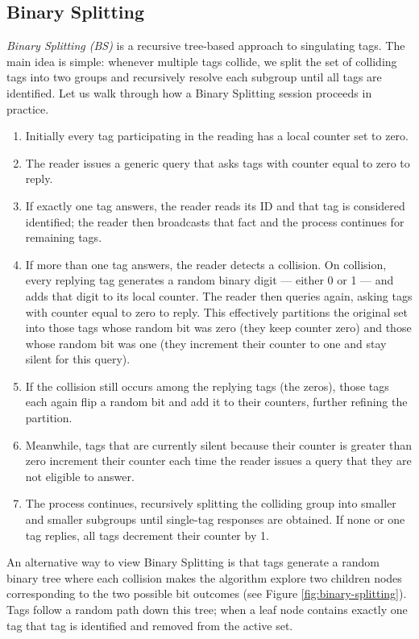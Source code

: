 \subsection{Binary Splitting}
\textit{Binary Splitting (BS)} is a recursive tree-based approach to singulating tags. The main idea is simple: whenever multiple tags collide, we split the set of colliding tags into two groups and recursively resolve each subgroup until all tags are identified.
Let us walk through how a Binary Splitting session proceeds in practice. 
\begin{enumerate}
    \item Initially every tag participating in the reading has a local counter set to zero. 
    \item The reader issues a generic query that asks tags with counter equal to zero to reply. 
    \item If exactly one tag answers, the reader reads its ID and that tag is considered identified; the reader then broadcasts that fact and the process continues for remaining tags.
    \item If more than one tag answers, the reader detects a collision. On collision, every replying tag generates a random binary digit — either 0 or 1 — and adds that digit to its local counter. The reader then queries again, asking tags with counter equal to zero to reply. This effectively partitions the original set into those tags whose random bit was zero (they keep counter zero) and those whose random bit was one (they increment their counter to one and stay silent for this query). 
    \item If the collision still occurs among the replying tags (the zeros), those tags each again flip a random bit and add it to their counters, further refining the partition.
    \item Meanwhile, tags that are currently silent because their counter is greater than zero increment their counter each time the reader issues a query that they are not eligible to answer. 
    \item The process continues, recursively splitting the colliding group into smaller and smaller subgroups until single-tag responses are obtained. If none or one tag replies, all tags decrement their counter by 1.
\end{enumerate}
An alternative way to view Binary Splitting is that tags generate a random binary tree where each collision makes the algorithm explore two children nodes corresponding to the two possible bit outcomes (see Figure \ref{fig:binary-splitting}). Tags follow a random path down this tree; when a leaf node contains exactly one tag that tag is identified and removed from the active set.

